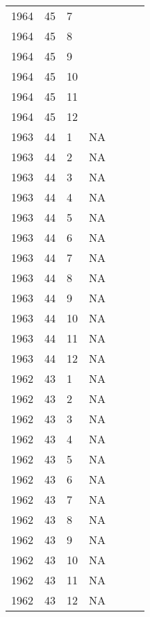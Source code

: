 \begin{longtable}{ |l|l|l|l|p{2.7cm}|l|p{2cm}| }
 1964 & 45 &     7 &         &                &  & \\
 1964 & 45 &     8 &         &                &  & \\
 1964 & 45 &     9 &         &                &  & \\
 1964 & 45 &    10 &         &                &   & \\
 1964 & 45 &    11 &         &                &  & \\
 1964 & 45 &    12 &         &                &  & \\
 1963 & 44 &     1 &      NA &                &  & \\
 1963 & 44 &     2 &      NA &                &  & \\
 1963 & 44 &     3 &      NA &                &  & \\
 1963 & 44 &     4 &      NA &                &  & \\
 1963 & 44 &     5 &      NA &                &  & \\
 1963 & 44 &     6 &      NA &                &  & \\
 1963 & 44 &     7 &      NA &                &  & \\
 1963 & 44 &     8 &      NA &                &  & \\
 1963 & 44 &     9 &      NA &                &  & \\
 1963 & 44 &    10 &      NA &                &  & \\
 1963 & 44 &    11 &      NA &                &  & \\
 1963 & 44 &    12 &      NA &                &  & \\
 1962 & 43 &     1 &      NA &                &  & \\
 1962 & 43 &     2 &      NA &                &  & \\
 1962 & 43 &     3 &      NA &                &  & \\
 1962 & 43 &     4 &      NA &                &  & \\
 1962 & 43 &     5 &      NA &                &  & \\
 1962 & 43 &     6 &      NA &                &  & \\
 1962 & 43 &     7 &      NA &                &   & \\
 1962 & 43 &     8 &      NA &                &  & \\
 1962 & 43 &     9 &      NA &                &  & \\
 1962 & 43 &    10 &      NA &                &  & \\
 1962 & 43 &    11 &      NA &                &  & \\
 1962 & 43 &    12 &      NA &                &  & \\
\end{longtable}
